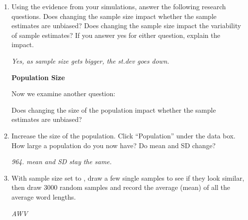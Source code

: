 \begin{enumerate}
\item Using the evidence from your simulations, answer the following
  research questions. Does changing the sample size impact whether the
  sample estimates are unbiased?  Does changing the sample size impact
  the variability of sample estimates?  If you answer yes for either
  question, explain the impact.
       \begin{students}
  \vspace{2cm}
\end{students}    
\begin{key}
   {\it  Yes, as sample size gets bigger, the st.dev goes down.}
\end{key}
 
\begin{students}
  \newpage
\end{students}

       \begin{center}
         {\large\bf Population Size}
       \end{center}

       Now we examine another question:
       \begin{center}
         {\sf  Does changing the size of the population impact whether
           the sample estimates are unbiased?} 
       \end{center}


     \item  Increase the size of the population. 
       Click ``Population''  under the data box. 
       How large a population do you now have?  Do mean and SD change?
       \begin{students}
  \vspace{1cm}
\end{students}    
\begin{key}
   {\it  964. mean and SD stay the same.}
\end{key}

     \item With sample size set to , draw a few single
       samples to see if they look similar, then 
       draw 3000 random samples and record the average
       (mean) of all the average word lengths.
       \begin{students}
  \vspace{1cm}
\end{students}    
\begin{key}
   {\it  AWV}
\end{key}


\end{enumerate}
